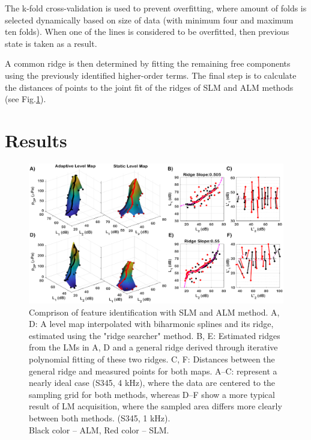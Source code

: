 \documentclass[journal,twoside,web]{ieeecolor2}
\begin{document}
The k-fold cross-validation is used to prevent overfitting, where amount of folds is selected dynamically based on size of data (with minimum four and maximum ten folds).
When one of the lines is considered to be overfitted, then previous state is taken as a result.

A common ridge is then determined by fitting the remaining free components using the previously identified higher-order terms.
The final step is to calculate the distances of points to the joint fit of the ridges of SLM and ALM methods (see Fig.\ref{fig_BLK}).

\section{Results}

\begin{figure}
\includegraphics[width=\textwidth]{Fig_5_assembly2.eps} %
\caption{Comprison of feature identification with SLM and ALM method. A, D: A level map interpolated with biharmonic splines and its ridge, estimated using the "ridge searcher" method.
B, E: Estimated ridges from the LMs in A, D and a general ridge derived through iterative polynomial fitting of these two ridges.
C, F: Distances between the general ridge and measured points for both maps.
A–C: represent a nearly ideal case (S345, 4 kHz), where the data are centered to the sampling grid for both methods, whereas D–F show a more typical result of LM acquisition, where the sampled area differs more clearly between both methods. (S345, 1 kHz).\\ Black color – ALM, Red color – SLM.}
\label{fig_BLK}
\end{figure}
\end{document}
